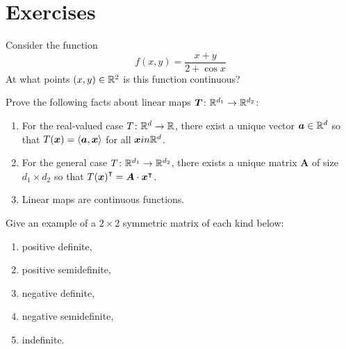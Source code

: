 

\section*{Exercises}
\begin{problem}[Basic]
Consider the function
\begin{equation*}
f(x,y) = \dfrac{x+y}{2+\cos x}
\end{equation*}
At what points $(x,y) \in \mathbb{R}^2$ is this function continuous?
\end{problem}

\begin{problem}[Advanced]
Prove the following facts about linear maps $\boldsymbol{T} \colon \mathbb{R}^{d_1} \to \mathbb{R}^{d_2}$:
\begin{enumerate}
	\item For the real-valued case $T \colon \mathbb{R}^d \to \mathbb{R}$, there exist a unique vector $\boldsymbol{a} \in \mathbb{R}^d$ so that $T(\boldsymbol{x}) = \langle \boldsymbol{a}, \boldsymbol{x} \rangle$ for all $\boldsymbol{x} in \mathbb{R}^d$.
	\item For the general case $T \colon \mathbb{R}^{d_1} \to \mathbb{R}^{d_2}$, there exists a unique matrix $\boldsymbol{A}$ of size $d_1 \times d_2$ so that ${T(\boldsymbol{x})}^\intercal = \boldsymbol{A} \cdot {\boldsymbol{x}}^\intercal$.
	\item Linear maps are continuous functions.
\end{enumerate}
\end{problem}

\begin{problem}[Intermediate]
Give an example of a $2 \times 2$ symmetric matrix of each kind below:
\begin{enumerate}
	\item positive definite, 
	\item positive semidefinite, 
	\item negative definite, 
	\item negative semidefinite,
	\item indefinite.
\end{enumerate}
\end{problem}

